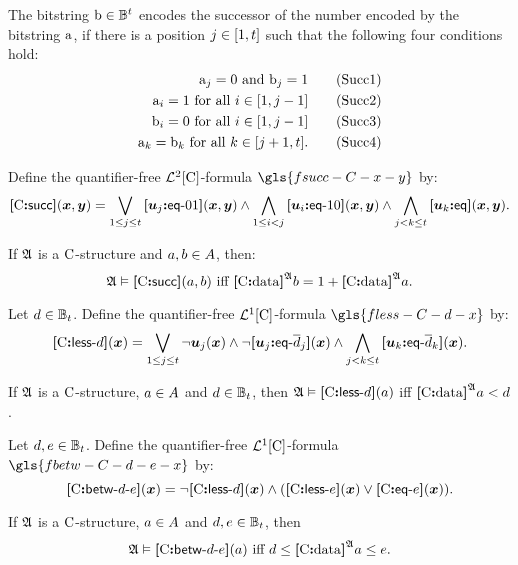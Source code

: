 The bitstring $\mathrm{b} \in \mathbb{B}^{t}$ encodes the successor of the number
encoded by the bitstring $\mathrm{a}$, if there is a position $j\in[1,t]$
such that the following four conditions hold:
\begin{align}
  \bstra_\jj = 0 \text{ and } \bstrb_\jj = 1 \tag{Succ1}\label{Succ1} \\
  \bstra_\ii = 1 \text{ for all } i \in [1,\jj-1] \tag{Succ2}\label{Succ2} \\
  \bstrb_\ii = 0 \text{ for all } i \in [1,\jj-1] \tag{Succ3}\label{Succ3} \\
  \bstra_\kk = \bstrb_\kk \text{ for all } \kk \in [\jj+1,\tbit].
  \tag{Succ4}\label{Succ4}
\end{align}
\begin{definition}
Define the quantifier-free $\mathcal{L}^{2}[{\mathrm{C}}]$-formula $\gls{fsucc-C-x-y}$ by:
\[
  {\bm{[}{\mathrm{C}}\mathord{\bm{:}}\mathsf{succ}\bm{]}}(\bm{x},\bm{y}) = \bigvee_{1 \leq j \leq t}
  {\bm{[}\bm{u}_{j}\mathord{\bm{:}}\mathsf{eq}{\hbox{-}}01\bm{]}}(\bm{x},\bm{y}) \land 
  \bigwedge_{1 \leq i < j} 
  {\bm{[}\bm{u}_{i}\mathord{\bm{:}}\mathsf{eq}{\hbox{-}}10\bm{]}}(\bm{x},\bm{y}) \land
  \bigwedge_{j < k \leq t} {\bm{[}\bm{u}_{k}\mathord{\bm{:}}\mathsf{eq}\bm{]}}(\bm{x},\bm{y}).
\]
\end{definition}
\begin{remark}
If $\mathfrak{A}$ is a ${\mathrm{C}}$-structure and $a, b \in A$,
then:
\[
  \miff{
  \StrA \vDash \fsucc\CS(\ea, \eb)}{
  \data\CS\StrA\eb = 1 + \data\CS\StrA\ea}.
\]
\end{remark}
\begin{definition}
Let $d \in \mathbb{B}_{t}$.
Define the quantifier-free $\mathcal{L}^{1}[{\mathrm{C}}]$-formula $\gls{fless-C-d-x}$ by:
\[
  {\bm{[}{\mathrm{C}}\mathord{\bm{:}}\mathsf{less}{\hbox{-}}d\bm{]}}(\bm{x}) = \bigvee_{1 \leq j \leq t} \lnot\bm{u}_{j}(\bm{x})
  \land \lnot{\bm{[}\bm{u}_{j}\mathord{\bm{:}}\mathsf{eq}{\hbox{-}}\overline{d}_j\bm{]}}(\bm{x})
    \land \bigwedge_{j < k \leq t} {\bm{[}\bm{u}_{k}\mathord{\bm{:}}\mathsf{eq}{\hbox{-}}\overline{d}_k\bm{]}}(\bm{x}).
\]
\end{definition}
\begin{remark}
If $\mathfrak{A}$ is a ${\mathrm{C}}$-structure, $a \in A$ and $d \in
\mathbb{B}_{t}$, then $\mathfrak{A} \vDash {\bm{[}{\mathrm{C}}\mathord{\bm{:}}\mathsf{less}{\hbox{-}}d\bm{]}}(a)$ iff ${\bm{[}{\mathrm{C}}\mathord{\bm{:}}\mathrm{data}\bm{]}}^{\mathfrak{A}}a
< d$.
\end{remark}
\begin{definition}
Let $d,e\in\mathbb{B}_{t}$.
Define the quantifier-free $\mathcal{L}^{1}[{\mathrm{C}}]$-formula $\gls{fbetw-C-d-e-x}$ by:
\[
  {\bm{[}{\mathrm{C}}\mathord{\bm{:}}\mathsf{betw}{\hbox{-}}d{\hbox{-}}e\bm{]}}(\bm{x}) = \lnot{\bm{[}{\mathrm{C}}\mathord{\bm{:}}\mathsf{less}{\hbox{-}}d\bm{]}}(\bm{x}) \land 
  ({\bm{[}{\mathrm{C}}\mathord{\bm{:}}\mathsf{less}{\hbox{-}}e\bm{]}}(\bm{x})\lor {\bm{[}{\mathrm{C}}\mathord{\bm{:}}\mathsf{eq}{\hbox{-}}e\bm{]}}(\bm{x})).
\]
\end{definition}
\begin{remark}
If $\mathfrak{A}$ is a ${\mathrm{C}}$-structure, $a \in A$ and $d,e \in
\mathbb{B}_{t}$, then
\[
  \miff{
  \StrA \vDash \fbetw\CS\datad\datae(\ea)}{
  \datad \leq \data\CS\StrA\ea \leq
  \datae}.
\]
\end{remark}

